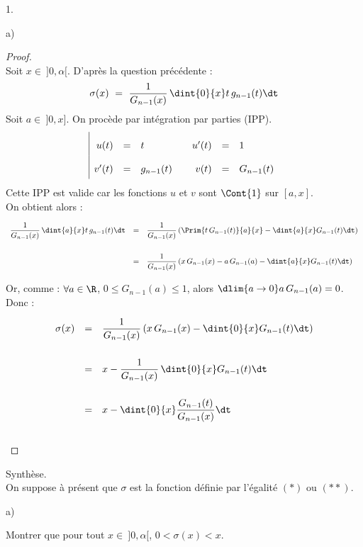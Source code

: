 \begin{noliste}{1.}
\begin{noliste}{a)}
    \begin{proof}~\\
      Soit $x \in \ ]0,\alpha[$. D'après la question précédente :
      \[
        \sigma(x) \ = \ \dfrac{1}{G_{n-1}(x)} \, \dint{0}{x} t \,
        g_{n-1}(t) \dt
      \]
      Soit $a \in \ ]0, x]$. On procède par intégration par parties 
      (IPP).
      \[
        \renewcommand{\arraystretch}{2}
        \begin{array}{|rcl@{\qquad}rcl}
          u(t) & = & t & u'(t) & = & 1 \\
          v'(t) & = & g_{n-1}(t) & v(t) & = & G_{n-1}(t)
        \end{array}
        \]
      Cette IPP est valide car les fonctions $u$ et $v$ sont 
      $\Cont{1}$ sur $[a, x]$.\\
      On obtient alors :
      \[
        \begin{array}{rcl}
          \dfrac{1}{G_{n-1}(x)} \, \dint{a}{x} t \, g_{n-1}(t) \dt
          & = & \dfrac{1}{G_{n-1}(x)} \left( \Prim{t \, G_{n-1}(t)}
          {a}{x} - \dint{a}{x} G_{n-1}(t) \dt\right)
          \\[.6cm]
          & = & \dfrac{1}{G_{n-1}(x)} \left( x \, G_{n-1}(x) - 
          a \, G_{n-1}(a) - \dint{a}{x} G_{n-1}(t) \dt \right)
        \end{array}
      \]
      
      
      \newpage
      
      
      Or, comme : $\forall a \in \R$, $0 \leq G_{n-1}(a) \leq 1$, alors 
      $\dlim{a \to 0} a \, 
      G_{n-1}(a) =0$. Donc :
      \[
        \begin{array}{rcl}
          \sigma(x) & = & \dfrac{1}{G_{n-1}(x)} \left( x \, G_{n-1}(x)
          - \dint{0}{x} G_{n-1}(t) \dt \right)
          \\[.6cm]
          & = & x - \dfrac{1}{G_{n-1}(x)} \, \dint{0}{x} G_{n-1}(t) \dt
          \\[.6cm]
          & = & x - \dint{0}{x} \dfrac{G_{n-1}(t)}{G_{n-1}(x)} \dt
        \end{array}
      \]
      \conc{$\forall x \in \ ]0,\alpha[$, $\sigma(x) = x - \dint{0}{x}
      \dfrac{G_{n-1}(t)}{G_{n-1}(x)} \dt$}~\\[-1cm]
    \end{proof}
  \end{noliste}
  
  \item Synthèse.\\
  On suppose à présent que $\sigma$ est la fonction définie par 
  l'égalité $(*)$ ou $(**)$.
  \begin{noliste}{a)}
    \setlength{\itemsep}{2mm}
    \item Montrer que pour tout $x \in \ ]0, \alpha[$, $0 < \sigma(x)
    <x$.
    

\end{noliste}
\end{noliste}

